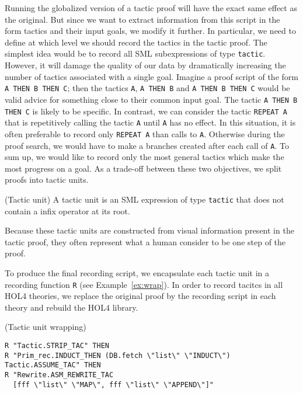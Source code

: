 \documentclass[runningheads,a4paper,draft]{svjour3}
\def\holfour{\textsf{HOL4}\xspace}
\def\sml{\textsf{SML}\xspace}
\begin{document}
Running the globalized version of a tactic proof will have the exact same
effect as the original. But since we want to extract information from this
script in the form tactics and their input goals, we modify it further.
In particular, we need to define at which level we should record the tactics in
the tactic proof. The simplest idea would be to record all \sml subexpressions
of type \texttt{tactic}. However, it will damage the quality of our data by
dramatically increasing the number of tactics associated with a single goal.
Imagine a proof script of the form \texttt{A THEN B THEN C}; then the tactics
\texttt{A}, \texttt{A THEN B} and \texttt{A THEN B THEN C} would be valid
advice for something close to their common input goal. The tactic
\texttt{A THEN B THEN C} is likely to be specific. In contrast, we can consider
the tactic \texttt{REPEAT A} that is repetitively calling the tactic \texttt{A}
until
\texttt{A} has no effect. In this situation, it is often preferable to record
only \texttt{REPEAT A} than calls to \texttt{A}. Otherwise during the
proof search, we would have to make a branches created after each call of
\texttt{A}.
To sum up, we would like to record only the most general tactics which
make the most progress on a goal. As a trade-off between these two objectives,
we split proofs into tactic units.

\begin{definition}(Tactic unit)
A tactic unit is an \sml expression of type \texttt{tactic} that does not contain a
infix operator at its root.
\end{definition}

Because these tactic units are constructed from visual information present in
the tactic proof, they often represent what a human consider to be one step of
the proof.

To produce the final recording script, we encapsulate each tactic unit
in a recording function \texttt{R} (see Example~\ref{ex:wrap}). In order to
record
tacitcs in all \holfour theories, we replace the original proof by the
recording script in each theory and rebuild the \holfour library.

\begin{example}\label{ex:wrap} (Tactic unit wrapping)
\begin{lstlisting}[language=SMLSmall]
R "Tactic.STRIP_TAC" THEN
R "Prim_rec.INDUCT_THEN (DB.fetch \"list\" \"INDUCT\") Tactic.ASSUME_TAC" THEN
R "Rewrite.ASM_REWRITE_TAC
  [fff \"list\" \"MAP\", fff \"list\" \"APPEND\"]"
\end{lstlisting}
\end{example}
\end{document}
